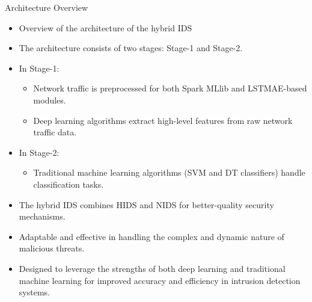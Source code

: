 \documentclass{beamer}
\begin{document}
\begin{frame}{Architecture Overview}
  \begin{itemize}
    \item Overview of the architecture of the hybrid IDS
  \end{itemize}

    
  \begin{itemize}
    \item The architecture consists of two stages: Stage-1 and Stage-2.
    \item In Stage-1:
      \begin{itemize}
        \item Network traffic is preprocessed for both Spark MLlib and LSTMAE-based modules.
        \item Deep learning algorithms extract high-level features from raw network traffic data.
      \end{itemize}
    \item In Stage-2:
      \begin{itemize}
        \item Traditional machine learning algorithms (SVM and DT classifiers) handle classification tasks.
      \end{itemize}
    \item The hybrid IDS combines HIDS and NIDS for better-quality security mechanisms.
    \item Adaptable and effective in handling the complex and dynamic nature of malicious threats.
    \item Designed to leverage the strengths of both deep learning and traditional machine learning for improved accuracy and efficiency in intrusion detection systems.
  \end{itemize}
\end{frame}
\end{document}
